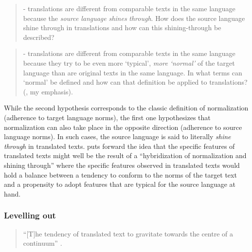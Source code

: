 \begin{quote}
{}- translations are different from comparable texts in the same language because the \textit{source} \textit{language} \textit{shines} \textit{through}. How does the source language shine through in translations and how can this shining-through be described?
\end{quote}

\begin{quote}
{}- translations are different from comparable texts in the same language because they try to be even more ‘typical’, \textit{more} \textit{‘normal’} of the target language than are original texts in the same language. In what terms can ‘normal’ be defined and how can that definition be applied to translations? (\citealt[61-62]{teich_cross-linguistic_2003}, my emphasis).
\end{quote}

While the second hypothesis corresponds to the classic definition of normalization (adherence to target language norms), the first one hypothesizes that normalization can also take place in the opposite direction (adherence to source language norms). In such cases, the source language is said to literally \textit{shine} \textit{through} in translated texts. \citet[136]{kranich_between_2011} puts forward the idea that the specific features of translated texts might well be the result of a “hybridization of normalization and shining through” where the specific features observed in translated texts would hold a balance between a tendency to conform to the norms of the target text and a propensity to adopt features that are typical for the source language at hand.

\subsubsection{Levelling out}
\label{sec:2.2.2.4}  
\begin{quote}
“[T]he tendency of translated text to gravitate towards the centre of a continuum” \citep[184]{baker_corpus-based_1996}.
\end{quote}

